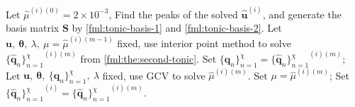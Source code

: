 \documentclass[10pt,conference]{ieeeconf}
\begin{document}
\begin{algorithm}[!tb]
\begin{algorithmic}[1]
    \STATE Let $\hat{\mu}^{(i)(0)} = 2 \times 10^{-3}$,
    \STATE Find the peaks of the solved $\hat{\mathbf{u}}^{(i)}$, and generate the basis matrix $\mathbf{S}$ by \eqref{fml:tonic-basis-1} and \eqref{fml:tonic-basis-2}.
    \STATE Let $\mathbf{u},~\boldsymbol{\theta},~\lambda,~\mu = \hat{\mu}^{(i)(m-1)}$ fixed, use interior point method to solve ${\{\hat{\mathbf{q}}_{n}\}_{n=1}^{\chi}}^{(i)(m)}$ from \eqref{fml:the:second-tonic}. Set $\{\mathbf{q}_{n}\}_{n=1}^{\chi} = {\{\hat{\mathbf{q}}_{n}\}_{n=1}^{\chi}}^{(i)(m)}$;
    \STATE Let $\mathbf{u},~\boldsymbol{\theta},~\{\mathbf{q}_{n}\}_{n=1}^{\chi},~\lambda$ fixed, use GCV to solve $\hat{\mu}^{(i)(m)}$. Set $\mu = \hat{\mu}^{(i)(m)}$;
    \ENDFOR
    \STATE Set ${\{\hat{\mathbf{q}}_{n}\}_{n=1}^{\chi}}^{(i)} =  {\{\hat{\mathbf{q}}_{n}\}_{n=1}^{\chi}}^{(i)(m)}$.
    \ENDFOR
  \end{algorithmic}
\end{algorithm}
\end{document}
